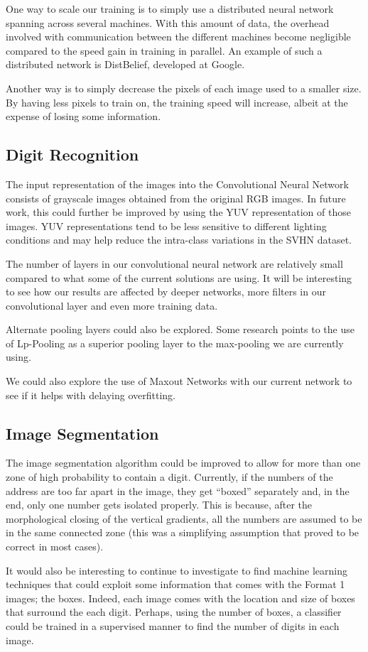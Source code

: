 \documentclass{article} %
\begin{document}
One way to scale our training is to simply use a distributed neural network spanning across several machines. With this amount of data, the overhead involved with communication between the different machines become negligible compared to the speed gain in training in parallel. An example of such a distributed network is DistBelief\cite{dean2012large}, developed at Google.

Another way is to simply decrease the pixels of each image used to a smaller size. By having less pixels to train on, the training speed will increase, albeit at the expense of losing some information.

\subsection{Digit Recognition}
The input representation of the images into the Convolutional Neural Network consists of grayscale images obtained from the original RGB images. In future work, this could further be improved by using the YUV representation of those images. YUV representations tend to be less sensitive to different lighting conditions and may help reduce the intra-class variations in the SVHN dataset.

The number of layers in our convolutional neural network are relatively small compared to what some of the current solutions are using. It will be interesting to see how our results are affected by deeper networks, more filters in our convolutional layer and even more training data. 

Alternate pooling layers could also be explored. Some research points to the use of Lp-Pooling as a superior pooling layer to the max-pooling we are currently using.

We could also explore the use of Maxout Networks with our current network to see if it helps with delaying overfitting.

\subsection{Image Segmentation}
The image segmentation algorithm could be improved to allow for more than one zone of high probability to contain a digit. Currently, if the numbers of the address are too far apart in the image, they get “boxed” separately and, in the end, only one number gets isolated properly. This is because, after the morphological closing of the vertical gradients, all the numbers are assumed to be in the same connected zone (this was a simplifying assumption that proved to be correct in most cases).

It would also be interesting to continue to investigate to find machine learning techniques that could exploit some information that comes with the Format 1 images; the boxes. Indeed, each image comes with the location and size of boxes that surround the each digit. Perhaps, using the number of boxes, a classifier could be trained in a supervised manner to find the number of digits in each image. 



\end{document}
